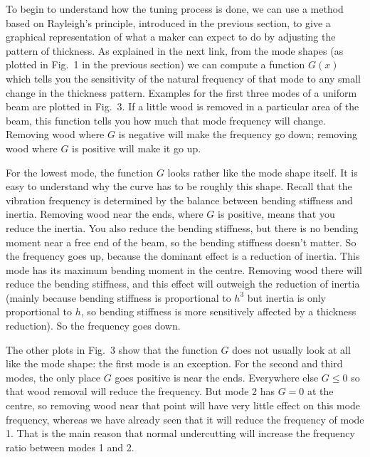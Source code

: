   To begin to understand how the tuning process is done, we can use a method 
  based on Rayleigh's principle, introduced in the previous section, to give a 
  graphical representation of what a maker can expect to do by adjusting the 
  pattern of thickness. As explained in the next link, from the mode shapes (as 
  plotted in Fig.\ 1 in the previous section) we can compute a function $G(x)$ 
  which tells you the sensitivity of the natural frequency of that mode to any 
  small change in the thickness pattern. Examples for the first three modes of 
  a uniform beam are plotted in Fig.\ 3. If a little wood is removed in a 
  particular area of the beam, this function tells you how much that mode 
  frequency will change. Removing wood where $G$ is negative will make the 
  frequency go down; removing wood where $G$ is positive will make it go up. 

  For the lowest mode, the function $G$ looks rather like the mode shape 
  itself. It is easy to understand why the curve has to be roughly this shape. 
  Recall that the vibration frequency is determined by the balance between 
  bending stiffness and inertia. Removing wood near the ends, where $G$ is 
  positive, means that you reduce the inertia. You also reduce the bending 
  stiffness, but there is no bending moment near a free end of the beam, so the 
  bending stiffness doesn't matter. So the frequency goes up, because the 
  dominant effect is a reduction of inertia. This mode has its maximum bending 
  moment in the centre. Removing wood there will reduce the bending stiffness, 
  and this effect will outweigh the reduction of inertia (mainly because 
  bending stiffness is proportional to $h^3$ but inertia is only proportional 
  to $h$, so bending stiffness is more sensitively affected by a thickness 
  reduction). So the frequency goes down. 

  The other plots in Fig.\ 3 show that the function $G$ does not usually look 
  at all like the mode shape: the first mode is an exception. For the second 
  and third modes, the only place $G$ goes positive is near the ends. 
  Everywhere else $G \le 0$ so that wood removal will reduce the frequency. But 
  mode 2 has $G=0$ at the centre, so removing wood near that point will have 
  very little effect on this mode frequency, whereas we have already seen that 
  it will reduce the frequency of mode 1. That is the main reason that normal 
  undercutting will increase the frequency ratio between modes 1 and 2. 

